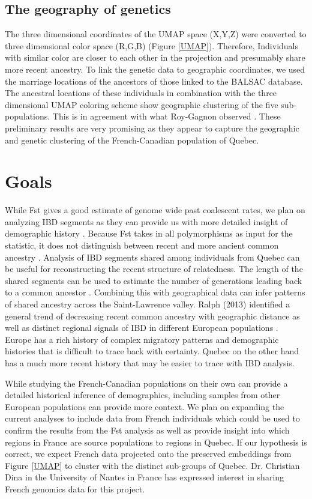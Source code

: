 \documentclass[
11pt, %
oneside, %
english, %
doublespacing, %
headsepline, %
chapterinoneline, %
]{MastersDoctoralThesis} %
\begin{document}
\subsection{The geography of genetics}
The three dimensional coordinates of the UMAP space (X,Y,Z) were converted to three dimensional color space (R,G,B) (Figure \ref{UMAP}).
Therefore, Individuals with similar color are closer to each other in the projection and presumably share more recent ancestry.
To link the genetic data to geographic coordinates, we used the marriage locations of the ancestors of those linked to the BALSAC database.
The ancestral locations of these individuals in combination with the three dimensional UMAP coloring scheme show geographic clustering of the five sub-populations.
This is in agreement with what Roy-Gagnon observed \citep{Roy-Gagnon2011}.
These preliminary results are very promising as they appear to capture the geographic and genetic clustering of the French-Canadian population of Quebec.

\section{Goals}
While Fst gives a good estimate of genome wide past coalescent rates, we plan on analyzing IBD segments as they can provide us with more detailed insight of demographic history \citep{Charlesworth2003, Ralph2013, Baharian2016}.
Because Fst takes in all polymorphisms as input for the statistic, it does not distinguish between recent and more ancient common ancestry \citep{Ralph2013}.
Analysis of IBD segments shared among individuals from Quebec can be useful for reconstructing the recent structure of relatedness.
The length of the shared segments can be used to estimate the number of generations leading back to a common ancestor \citep{Palamara2015,Campbell2012,Baharian2016}.
Combining this with geographical data can infer patterns of shared ancestry across the Saint-Lawrence valley.
Ralph (2013) identified a general trend of decreasing recent common ancestry with geographic distance as well as distinct regional signals of IBD in different European populations \citep{Ralph2013}.
Europe has a rich history of complex migratory patterns and demographic histories that is difficult to trace back with certainty. 
Quebec on the other hand has a much more recent history that may be easier to trace with IBD analysis.

While studying the French-Canadian populations on their own can provide a detailed historical inference of demographics, including samples from other European populations can provide more context.
We plan on expanding the current analyses to include data from French individuals which could be used to confirm the results from the Fst analysis as well as provide insight into which regions in France are source populations to regions in Quebec.
If our hypothesis is correct, we expect French data projected onto the preserved embeddings from Figure \ref{UMAP} to cluster with the distinct sub-groups of Quebec.
Dr. Christian Dina in the University of Nantes in France has expressed interest in sharing French genomics data for this project.
\end{document}
